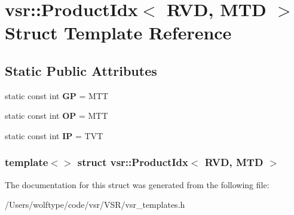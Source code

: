 \hypertarget{structvsr_1_1_product_idx_3_01_r_v_d_00_01_m_t_d_01_4}{\section{vsr\-:\-:Product\-Idx$<$ R\-V\-D, M\-T\-D $>$ Struct Template Reference}
\label{structvsr_1_1_product_idx_3_01_r_v_d_00_01_m_t_d_01_4}
}
\subsection*{Static Public Attributes}
\begin{DoxyCompactItemize}
\item 
\hypertarget{structvsr_1_1_product_idx_3_01_r_v_d_00_01_m_t_d_01_4_a63a2fdb4b4d69fb19856a531bf4e43a8}{static const int {\bfseries G\-P} = M\-T\-T}\label{structvsr_1_1_product_idx_3_01_r_v_d_00_01_m_t_d_01_4_a63a2fdb4b4d69fb19856a531bf4e43a8}

\item 
\hypertarget{structvsr_1_1_product_idx_3_01_r_v_d_00_01_m_t_d_01_4_abec27c66334d1f38dce48f173b59cda9}{static const int {\bfseries O\-P} = M\-T\-T}\label{structvsr_1_1_product_idx_3_01_r_v_d_00_01_m_t_d_01_4_abec27c66334d1f38dce48f173b59cda9}

\item 
\hypertarget{structvsr_1_1_product_idx_3_01_r_v_d_00_01_m_t_d_01_4_a4cc102e9ea8425003880aaf10f79d5fe}{static const int {\bfseries I\-P} = T\-V\-T}\label{structvsr_1_1_product_idx_3_01_r_v_d_00_01_m_t_d_01_4_a4cc102e9ea8425003880aaf10f79d5fe}

\end{DoxyCompactItemize}
\subsubsection*{template$<$$>$ struct vsr\-::\-Product\-Idx$<$ R\-V\-D, M\-T\-D $>$}



The documentation for this struct was generated from the following file\-:\begin{DoxyCompactItemize}
\item 
/\-Users/wolftype/code/vsr/\-V\-S\-R/vsr\-\_\-templates.\-h\end{DoxyCompactItemize}
